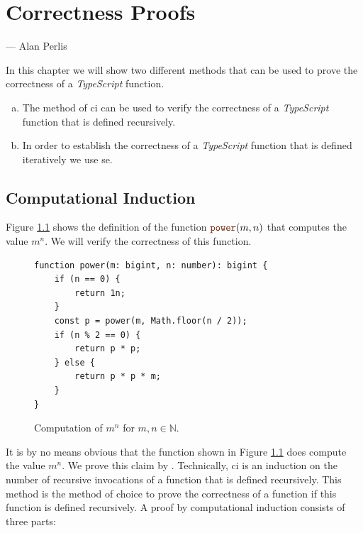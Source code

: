 \chapter{Correctness Proofs}
\epigraph{}{
    --- \calligfont Alan Perlis}

\noindent
In this chapter we will show two different methods that can be used to prove the correctness of a \textsl{TypeScript}
function.
\begin{enumerate}[(a)]
\item The method of \gls{ci} can be used to verify the correctness of a \textsl{TypeScript}
      function that is defined recursively.
\item In order to establish the correctness of a \textsl{TypeScript} function that is defined iteratively we use
      \gls{se}. 
\end{enumerate}

\section{Computational Induction}
Figure \ref{fig:power.py} shows the definition of the function $\mytt{power}(m,n)$ that computes
the value $m^n$.  We will verify the correctness of this function.

\begin{figure}[!h]
  \centering
\begin{verbatim}
function power(m: bigint, n: number): bigint {
    if (n == 0) {
        return 1n;
    }
    const p = power(m, Math.floor(n / 2));
    if (n % 2 == 0) {
        return p * p;
    } else {
        return p * p * m;
    }
}
\end{verbatim}
\vspace*{-0.3cm}
  \caption{Computation of $m^n$ for $m,n \in \mathbb{N}$.}
  \label{fig:power.py}
\end{figure} 

It is by no means obvious that the function shown in Figure \ref{fig:power.py} does compute the value
$m^n$.  We prove this claim by  .
Technically, \gls{ci} is an induction on the number of recursive invocations of a function that is defined recursively.
This method is the method of choice to prove the correctness of a function if this function is defined recursively.
A proof by computational induction consists of three parts:

